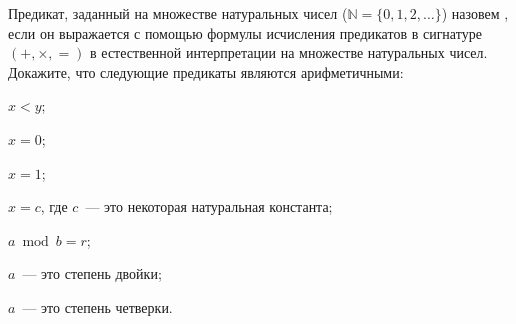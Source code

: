 Предикат, заданный на множестве натуральных чисел ($\mathbb{N} = \{0, 1, 2, \dots\}$) назовем
, если он выражается с помощью формулы исчисления предикатов в сигнатуре $(+,
\times, =)$ в естественной интерпретации на множестве натуральных чисел. Докажите, что следующие
предикаты являются арифметичными:
\begin{enumcyr}
    \item $x < y$;
    \item $x = 0$;
    \item $x = 1$;
    \item $x = c$, где $c$~--- это некоторая натуральная константа;
    \item $a \bmod b = r$;
    \item $a$~--- это степень двойки;
    \item $a$~--- это степень четверки.
\end{enumcyr}